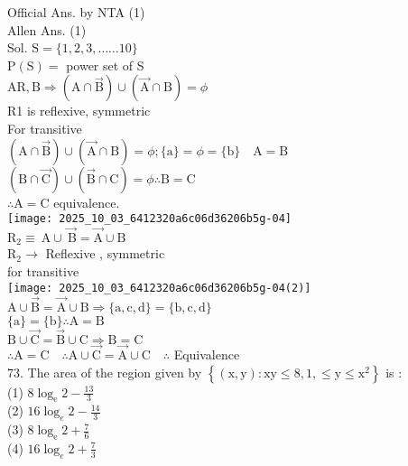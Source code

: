 \documentclass[10pt]{article}
\begin{document}
Official Ans. by NTA (1)\\
Allen Ans. (1)\\
Sol. \(\mathrm{S}=\{1,2,3, \ldots \ldots 10\}\)\\
\(\mathrm{P}(\mathrm{S})=\) power set of S\\
\(\mathrm{AR}, \mathrm{B} \Rightarrow(\mathrm{A} \cap \overrightarrow{\mathrm{B}}) \cup(\overrightarrow{\mathrm{A}} \cap \mathrm{B})=\phi\)\\
R1 is reflexive, symmetric\\
For transitive\\
\((\mathrm{A} \cap \overrightarrow{\mathrm{B}}) \cup(\overrightarrow{\mathrm{A}} \cap \mathrm{B})=\phi ;\{\mathrm{a}\}=\phi=\{\mathrm{b}\} \quad \mathrm{A}=\mathrm{B}\)\\
\((\mathrm{B} \cap \overrightarrow{\mathrm{C}}) \cup(\overrightarrow{\mathrm{B}} \cap \mathrm{C})=\phi \therefore \mathrm{B}=\mathrm{C}\)\\
\(\therefore \mathrm{A}=\mathrm{C}\) equivalence.\\
\texttt{[image: 2025\_10\_03\_6412320a6c06d36206b5g-04]}\\
\(\mathrm{R}_{2} \equiv \mathrm{~A} \cup \overrightarrow{\mathrm{~B}}=\overrightarrow{\mathrm{A}} \cup \mathrm{B}\)\\
\(\mathrm{R}_{2} \rightarrow\) Reflexive , symmetric\\
for transitive\\
\texttt{[image: 2025\_10\_03\_6412320a6c06d36206b5g-04(2)]}\\
\(\mathrm{A} \cup \overrightarrow{\mathrm{B}}=\overrightarrow{\mathrm{A}} \cup \mathrm{B} \Rightarrow\{\mathrm{a}, \mathrm{c}, \mathrm{d}\}=\{\mathrm{b}, \mathrm{c}, \mathrm{d}\}\)\\
\(\{\mathrm{a}\}=\{\mathrm{b}\} \therefore \mathrm{A}=\mathrm{B}\)\\
\(\mathrm{B} \cup \overrightarrow{\mathrm{C}}=\overrightarrow{\mathrm{B}} \cup \mathrm{C} \Rightarrow \mathrm{B}=\mathrm{C}\)\\
\(\therefore \mathrm{A}=\mathrm{C} \quad \therefore \mathrm{A} \cup \overrightarrow{\mathrm{C}}=\overrightarrow{\mathrm{A}} \cup \mathrm{C} \quad \therefore\) Equivalence\\
73. The area of the region given by \(\left\{(\mathrm{x}, \mathrm{y}): \mathrm{xy} \leq 8,1, \leq \mathrm{y} \leq \mathrm{x}^{2}\right\}\) is :\\
(1) \(8 \log _{\mathrm{e}} 2-\frac{13}{3}\)\\
(2) \(16 \log _{e} 2-\frac{14}{3}\)\\
(3) \(8 \log _{\mathrm{e}} 2+\frac{7}{6}\)\\
(4) \(16 \log _{e} 2+\frac{7}{3}\)
\end{document}
